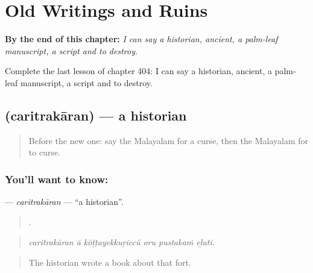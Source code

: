 
\chapter{Old Writings and Ruins}
\label{ch:ml-old-writings-and-ruins}

\begin{chapteropening}
\textbf{By the end of this chapter:} \emph{I can say a historian, ancient, a palm-leaf manuscript, a script and to destroy.}

Complete the last lesson of chapter 404: I can say a historian, ancient, a palm-leaf manuscript, a script and to destroy.
\end{chapteropening}

\section[\texorpdfstring{\ml{ചരിത്രകാരൻ} (caritrakāran)}{ചരിത്രകാരൻ (caritrakāran)}]{ (caritrakāran) — a historian}

\label{lesson:ML-C404-caritrakaran}



\begin{quote}
Before the new one: say the Malayalam for a curse, then the Malayalam for to curse.
\end{quote}

\subsection*{You'll want to know: }
\textbf{} — \emph{caritrakāran} — \textquotedblleft{}a historian\textquotedblright{}.

\begin{quote}
     .
\end{quote}

\begin{quote}
\emph{caritrakāran ā kōṭṭayekkuṟiccŭ oru pustakaṁ eḻuti.}
\end{quote}

\begin{quote}
The historian wrote a book about that fort.
\end{quote}

